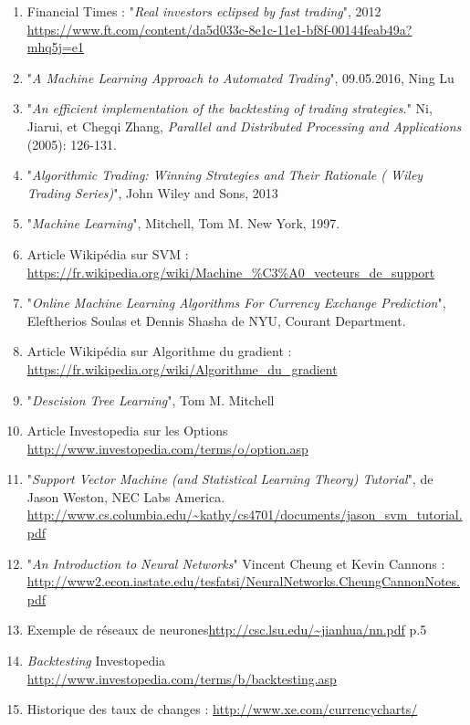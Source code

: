 \documentclass[a4paper, 11pt]{article}
\begin{document}
\begin{enumerate}
\item Financial Times : "\textit{Real investors eclipsed by fast trading}", 2012 \url{https://www.ft.com/content/da5d033c-8e1c-11e1-bf8f-00144feab49a?mhq5j=e1} \label{real investors}
\item "\textit{A Machine Learning Approach to Automated Trading}", 09.05.2016, Ning Lu
\item "\textit{An efficient implementation of the backtesting of trading strategies.}" Ni, Jiarui, et Chegqi Zhang, \textit{Parallel and Distributed Processing and Applications} (2005): 126-131.
\item "\textit{Algorithmic Trading: Winning Strategies and Their Rationale ( Wiley Trading Series)}", John Wiley and Sons, 2013
\item "\textit{Machine Learning}", Mitchell, Tom M. New York, 1997. \label{mitchell}
\item Article Wikipédia sur SVM : \url{https://fr.wikipedia.org/wiki/Machine_\%C3\%A0_vecteurs_de_support} \label{wikipedia svm}
\item "\textit{Online Machine Learning Algorithms For Currency Exchange Prediction}", Eleftherios Soulas et Dennis Shasha de NYU, Courant Department. \label{descente du gradient stochastique}
\item  Article Wikipédia sur Algorithme du gradient : \url{https://fr.wikipedia.org/wiki/Algorithme_du_gradient} \label{wikipedia descente du gradient}
\item "\textit{Descision Tree Learning}", Tom M. Mitchell
\item Article Investopedia sur les Options \url{http://www.investopedia.com/terms/o/option.asp}
\item "\textit{Support Vector Machine (and Statistical Learning Theory) Tutorial}", de Jason Weston, NEC Labs America. \url{http://www.cs.columbia.edu/~kathy/cs4701/documents/jason_svm_tutorial.pdf}
\item  "\textit{An Introduction to Neural Networks}" Vincent Cheung et Kevin Cannons : \url{http://www2.econ.iastate.edu/tesfatsi/NeuralNetworks.CheungCannonNotes.pdf}
\item Exemple de réseaux de neurones\url{http://csc.lsu.edu/~jianhua/nn.pdf} p.5
\item \textit{Backtesting} Investopedia \url{http://www.investopedia.com/terms/b/backtesting.asp} \label{backtesting investopedia}
\item Historique des taux de changes : \url{http://www.xe.com/currencycharts/} \label{historique taux de change}

\end{enumerate}
\end{document}
